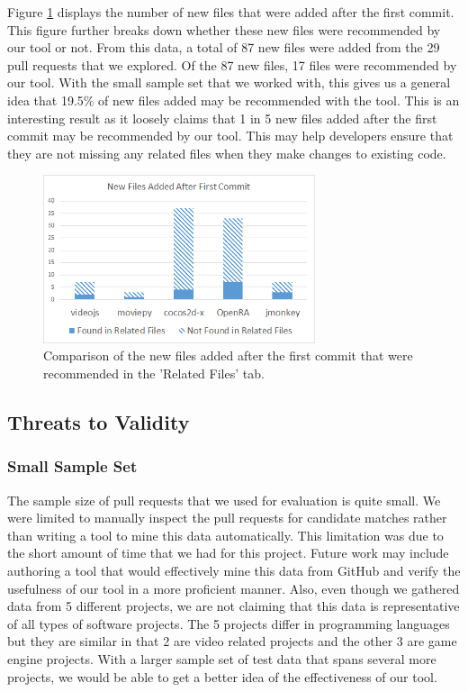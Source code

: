 Figure \ref{fig:newFilesAfterFirstCommit} displays the number of new files that were added after the first commit. This figure further breaks down whether these new files were recommended by our tool or not. From this data, a total of 87 new files were added from the 29 pull requests that we explored. Of the 87 new files, 17 files were recommended by our tool. With the small sample set that we worked with, this gives us a general idea that 19.5\% of new files added may be recommended with the tool. This is an interesting result as it loosely claims that 1 in 5 new files added after the first commit may be recommended by our tool. This may help developers ensure that they are not missing any related files when they make changes to existing code.

\begin{figure}[h!]
\includegraphics[width=8cm]{NewFilesAfterFirstCommit}
\caption{Comparison of the new files added after the first commit that were recommended in the 'Related Files' tab.}
\label{fig:newFilesAfterFirstCommit}
\end{figure}

\subsection{Threats to Validity}

\subsubsection{Small Sample Set}

The sample size of pull requests that we used for evaluation is quite small. We were limited to manually inspect the pull requests for candidate matches rather than writing a tool to mine this data automatically. This limitation was due to the short amount of time that we had for this project. Future work may include authoring a tool that would effectively mine this data from GitHub and verify the usefulness of our tool in a more proficient manner. Also, even though we gathered data from 5 different projects, we are not claiming that this data is representative of all types of software projects. The 5 projects differ in programming languages but they are similar in that 2 are video related projects and the other 3 are game engine projects. With a larger sample set of test data that spans several more projects, we would be able to get a better idea of the effectiveness of our tool.

